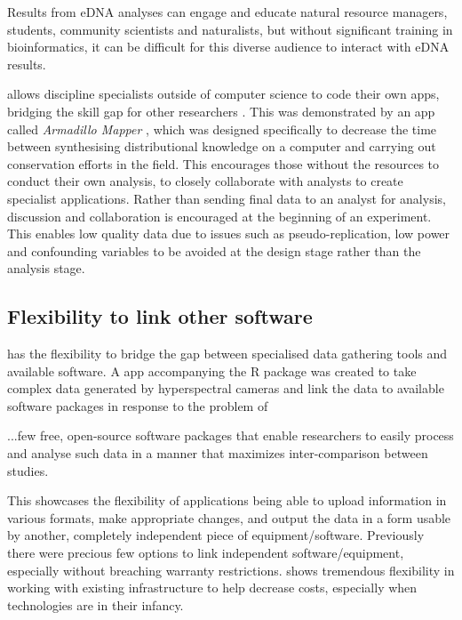 \begin{displayquote}
	Results from eDNA analyses can engage and educate natural resource managers, students, community scientists and naturalists, but without significant training in bioinformatics, it can be difficult for this diverse audience to interact with eDNA results.
\end{displayquote}

 allows discipline specialists outside of computer science to code their own apps, bridging the skill gap for other researchers \citep{niu_mass_2017}.  This was demonstrated by an app called \textit{Armadillo Mapper} \citep{feng_armadillo_2017}, which was designed specifically to decrease the time between synthesising distributional knowledge on a computer and carrying out conservation efforts in the field.  This encourages those without the resources to conduct their own analysis, to closely collaborate with analysts to create specialist applications.  Rather than sending final data to an analyst for analysis, discussion and collaboration is encouraged at the beginning of an experiment.  This enables low quality data due to issues such as pseudo-replication, low power and confounding variables to be avoided at the design stage rather than the analysis stage.


\subsection{Flexibility to link other software}
 has the flexibility to bridge the gap between specialised data gathering tools and available software.  A  app accompanying the R package  \citep{laney_toward_2013} was created to take complex data generated by hyperspectral cameras and link the data to available software packages in response to the problem of

\begin{displayquote}
	...few free, open-source software packages that enable researchers to easily process and analyse such data in a manner that maximizes inter-comparison between studies.
\end{displayquote}

This showcases the flexibility of  applications being able to upload information in various formats, make appropriate changes, and output the data in a form usable by another, completely independent piece of equipment/software.  Previously there were precious few options to link independent software/equipment, especially without breaching warranty restrictions.   shows tremendous flexibility in working with existing infrastructure to help decrease costs, especially when technologies are in their infancy.

